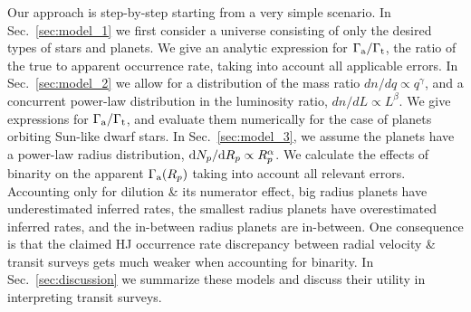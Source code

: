 \documentclass{emulateapj}
\begin{document}
Our approach is step-by-step starting from a very simple scenario.
In Sec.~\ref{sec:model_1} we first consider a universe consisting of only the 
desired types of stars and planets.  
We give an analytic expression for $\Gamma_{\rm a}/\Gamma_{\rm t}$, the ratio 
of the true to apparent occurrence rate, taking into account all applicable 
errors.
In Sec.~\ref{sec:model_2} we allow for a distribution of the mass ratio $dn/dq 
\propto q^\gamma$, 
and a concurrent power-law distribution in the luminosity ratio, $dn/dL 
\propto L^\beta$. 
We give expressions for $\Gamma_{\rm a}/\Gamma_{\rm t}$, and evaluate them 
numerically for the case of planets orbiting Sun-like dwarf stars.
In Sec.~\ref{sec:model_3}, 
we assume the planets have a power-law radius distribution, ${\rm 
d}N_p/{\rm d}R_p\propto R_p^\alpha$.  We calculate the 
effects of binarity on the apparent $\Gamma_{\rm a}(R_p)$ taking into account 
all relevant errors.
Accounting only for dilution \& its numerator effect, big radius planets have
underestimated inferred rates, the smallest radius planets have overestimated
inferred rates, and the in-between radius planets are in-between.
One consequence is that the claimed HJ occurrence rate discrepancy between 
radial velocity \& transit surveys gets much weaker when accounting for 
binarity.
In Sec.~\ref{sec:discussion} we summarize these models and discuss their 
utility in interpreting transit surveys.
\end{document}
